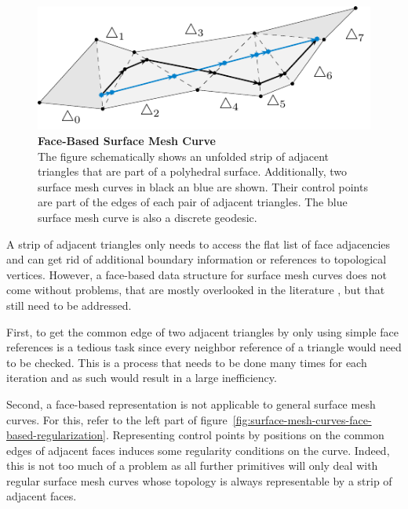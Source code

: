 \documentclass{stdlocal}
\begin{document}
  \begin{figure}
    \centering
    \includegraphics[width=0.8\linewidth]{figures/surface-mesh-curve.pdf}
    \caption[Face-Based Surface Mesh Curve]{%
      \textbf{Face-Based Surface Mesh Curve}\\
      The figure schematically shows an unfolded strip of adjacent triangles that are part of a polyhedral surface.
      Additionally, two surface mesh curves in black an blue are shown.
      Their control points are part of the edges of each pair of adjacent triangles.
      The blue surface mesh curve is also a discrete geodesic.
    }
    \label{fig:surface-mesh-curve-face-based}
  \end{figure}


  A strip of adjacent triangles only needs to access the flat list of face adjacencies and can get rid of additional boundary information or references to topological vertices.
  However, a face-based data structure for surface mesh curves does not come without problems, that are mostly overlooked in the literature \autocite{mancinelli2022}, but that still need to be addressed.

  First, to get the common edge of two adjacent triangles by only using simple face references is a tedious task since every neighbor reference of a triangle would need to be checked.
  This is a process that needs to be done many times for each iteration and as such would result in a large inefficiency.

  Second, a face-based representation is not applicable to general surface mesh curves.
  For this, refer to the left part of figure~\ref{fig:surface-mesh-curves-face-based-regularization}.
  Representing control points by positions on the common edges of adjacent faces induces some regularity conditions on the curve.
  Indeed, this is not too much of a problem as all further primitives will only deal with regular surface mesh curves whose topology is always representable by a strip of adjacent faces.
\end{document}
